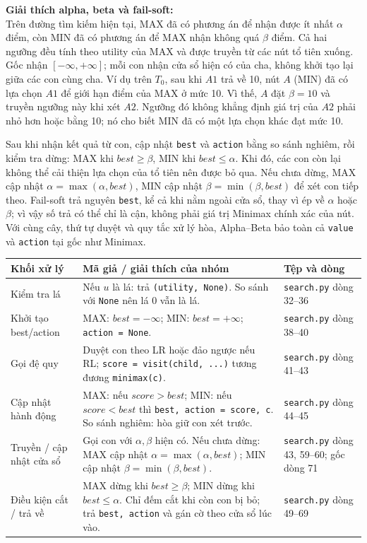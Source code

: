 \documentclass[11pt,a4paper]{article}
\begin{document}
\textbf{Giải thích alpha, beta và fail-soft:} \\
Trên đường tìm kiếm hiện tại, MAX đã có phương án để nhận được ít nhất $\alpha$ điểm, còn MIN đã có phương án để MAX nhận không quá $\beta$ điểm. Cả hai ngưỡng đều tính theo utility của MAX và được truyền từ các nút tổ tiên xuống.
Gốc nhận $[-\infty,+\infty]$; mỗi con nhận cửa sổ hiện có của cha, không khởi tạo lại giữa các con cùng cha.
Ví dụ trên $T_0$, sau khi $A1$ trả về 10, nút $A$ (MIN) đã có lựa chọn $A1$ để giới hạn điểm của MAX ở mức 10. Vì thế, $A$ đặt $\beta=10$ và truyền ngưỡng này khi xét $A2$. Ngưỡng đó không khẳng định giá trị của $A2$ phải nhỏ hơn hoặc bằng 10; nó cho biết MIN đã có một lựa chọn khác đạt mức 10.\par\smallskip
Sau khi nhận kết quả từ con, cập nhật \texttt{best} và \texttt{action} bằng so sánh nghiêm, rồi kiểm tra dừng: MAX khi $\mathit{best}\ge\beta$, MIN khi $\mathit{best}\le\alpha$. Khi đó, các con còn lại không thể cải thiện lựa chọn của tổ tiên nên được bỏ qua.
Nếu chưa dừng, MAX cập nhật $\alpha=\max(\alpha,\mathit{best})$, MIN cập nhật $\beta=\min(\beta,\mathit{best})$ để xét con tiếp theo.
Fail-soft trả nguyên \texttt{best}, kể cả khi nằm ngoài cửa sổ, thay vì ép về $\alpha$ hoặc $\beta$; vì vậy số trả có thể chỉ là cận, không phải giá trị Minimax chính xác của nút.
Với cùng cây, thứ tự duyệt và quy tắc xử lý hòa, Alpha--Beta bảo toàn cả \texttt{value} và \texttt{action} tại gốc như Minimax.\par\smallskip
\begingroup\footnotesize\renewcommand{\arraystretch}{1.25}\begin{tabularx}{\linewidth}{XXX}\toprule
\textbf{Khối xử lý} & \textbf{Mã giả / giải thích của nhóm} & \textbf{Tệp và dòng}\\\midrule
Kiểm tra lá & Nếu $u$ là lá: trả \texttt{(utility, None)}. So sánh với \texttt{None} nên lá 0 vẫn là lá. & \texttt{search.py} dòng 32--36\\
Khởi tạo best/action & MAX: $\mathit{best} = -\infty$; MIN: $\mathit{best} = +\infty$; \texttt{action = None}. & \texttt{search.py} dòng 38--40\\
Gọi đệ quy & Duyệt con theo LR hoặc đảo ngược nếu RL; \texttt{score = visit(child, ...)} tương đương \texttt{minimax(c)}. & \texttt{search.py} dòng 41--43\\
Cập nhật hành động & MAX: nếu $\mathit{score} > \mathit{best}$; MIN: nếu $\mathit{score} < \mathit{best}$ thì \texttt{best, action = score, c}. So sánh nghiêm: hòa giữ con xét trước. & \texttt{search.py} dòng 44--45\\
Truyền / cập nhật cửa sổ & Gọi con với $\alpha,\beta$ hiện có. Nếu chưa dừng: MAX cập nhật $\alpha=\max(\alpha,\mathit{best})$; MIN cập nhật $\beta=\min(\beta,\mathit{best})$. & \texttt{search.py} dòng 43, 59--60; gốc dòng 71\\
Điều kiện cắt / trả về & MAX dừng khi $\mathit{best}\ge\beta$; MIN dừng khi $\mathit{best}\le\alpha$. Chỉ đếm cắt khi còn con bị bỏ; trả \texttt{best, action} và gán cờ theo cửa sổ lúc vào. & \texttt{search.py} dòng 49--69\\
\bottomrule\end{tabularx}\endgroup\par\smallskip
\end{document}

